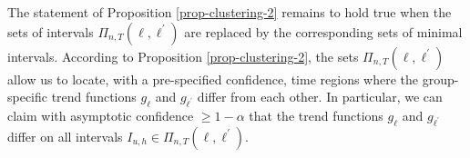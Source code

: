 The statement of Proposition \ref{prop-clustering-2} remains to hold true when the sets of intervals $\Pi_{n,T}(\ell,\ell^\prime)$ are replaced by the corresponding sets of minimal intervals. According to Proposition \ref{prop-clustering-2}, the sets $\Pi_{n,T}(\ell,\ell^\prime)$ allow us to locate, with a pre-specified confidence, time regions where the group-specific trend functions $g_\ell$ and $g_{\ell^\prime}$ differ from each other. In particular, we can claim with asymptotic confidence $\ge 1 - \alpha$ that the trend functions $g_\ell$ and $g_{\ell^\prime}$ differ on all intervals $I_{u,h} \in \Pi_{n,T}(\ell,\ell^\prime)$.